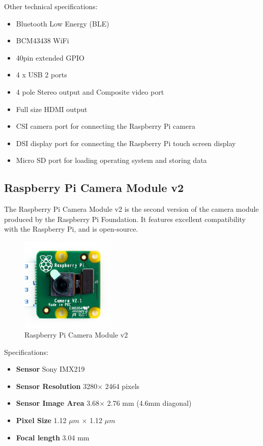 Other technical specifications\cite{rpi}:
\begin{itemize}
\itemsep0em 
\item Bluetooth Low Energy (BLE)
\item BCM43438 WiFi
\item 40pin extended GPIO
\item 4 x USB 2 ports
\item 4 pole Stereo output and Composite video port
\item Full size HDMI output
\item CSI camera port for connecting the Raspberry Pi camera
\item DSI display port for connecting the Raspberry Pi touch screen display
\item Micro SD port for loading operating system and storing data
\end{itemize}


\subsection{Raspberry Pi Camera Module v2}
The Raspberry Pi Camera Module v2 is the second version of the camera module produced by the Raspberry Pi Foundation. It features excellent compatibility with the Raspberry Pi, and is open-source. %
\begin{figure}[H]
  \centering
  \includegraphics[width=0.4\textwidth]{fig/picam}
  \caption{Raspberry Pi Camera Module v2}
  \label{fig:picam}
\end{figure}

Specifications\cite{cam}:
\begin{itemize}
\itemsep0em
\item \textbf{Sensor} Sony IMX219
\item \textbf{Sensor Resolution} 3280$\times$ 2464 pixels
\item \textbf{Sensor Image Area} 3.68$\times$ 2.76 mm (4.6mm diagonal)
\item \textbf{Pixel Size} 1.12 $\mu m$ $\times$ 1.12 $\mu m$
\item \textbf{Focal length} 3.04 mm
\end{itemize}

